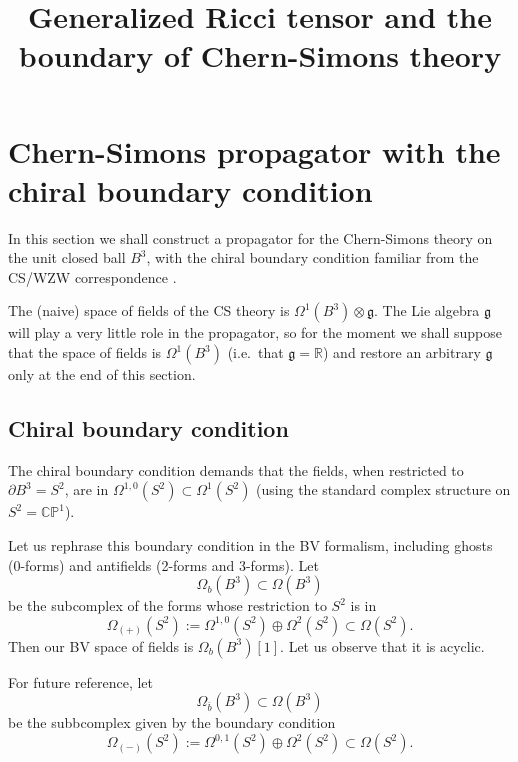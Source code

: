 \documentclass[a4paper]{amsart}
\title{Generalized Ricci tensor and the boundary of Chern-Simons theory}
\theoremstyle{plain}
\theoremstyle{definition}
\newcommand{\g}{\mathfrak{g}}
\newcommand{\R}{\mathbb{R}}
\newcommand{\CP}{\mathbb{CP}^1}
\begin{document}
\maketitle

\section{Chern-Simons propagator with the chiral boundary condition}

In this section we shall construct a propagator for the Chern-Simons theory on the unit closed ball $B^3$, with the chiral boundary condition familiar from the CS/WZW correspondence \cite{W}.

The (naive) space of fields of the CS theory is $\Omega^1(B^3)\otimes\g$. The Lie algebra $\g$ will play a very little role in the propagator, so for the moment we shall suppose that the space of fields is $\Omega^1(B^3)$ (i.e.\ that $\g=\R$) and restore an arbitrary $\g$ only at the  end of this section.

\subsection{Chiral boundary condition}
The chiral boundary condition demands that the fields, when restricted to $\partial B^3 = S^2$, are in $\Omega^{1,0}(S^2)\subset\Omega^1(S^2)$ (using the standard complex structure on $S^2=\CP$). 

Let us rephrase this boundary condition in the BV formalism, including ghosts (0-forms) and antifields (2-forms and 3-forms). Let 
$$\Omega_b(B^3)\subset\Omega(B^3)$$
be the subcomplex of the forms whose restriction to $S^2$ is in
$$\Omega_{(+)}(S^2):=\Omega^{1,0}(S^2)\oplus\Omega^2(S^2)\subset\Omega(S^2).$$
Then our BV space of fields is
$\Omega_b(B^3)[1]$.
Let us observe that it is acyclic.


For future reference, let 
$$\Omega_{\bar b}(B^3)\subset\Omega(B^3)$$
be the subbcomplex given by the boundary condition
$$\Omega_{(-)}(S^2):=\Omega^{0,1}(S^2)\oplus\Omega^2(S^2)\subset\Omega(S^2).$$
\end{document}
